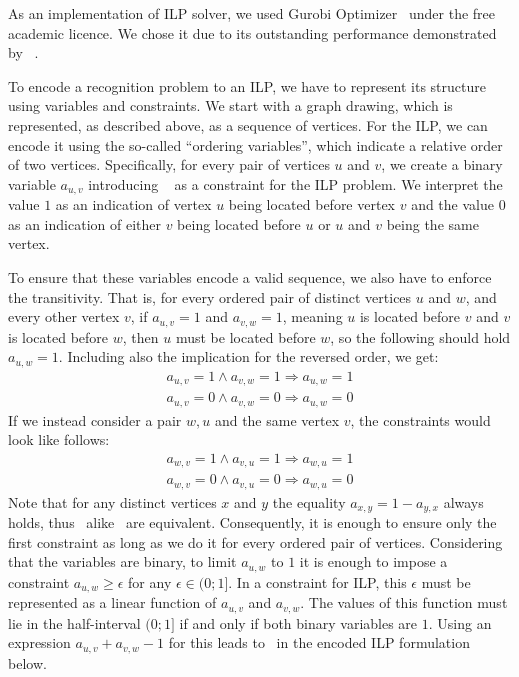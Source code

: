 As an implementation of ILP solver, we used Gurobi Optimizer~\cite{gurobi} under the free academic licence. We chose it due to its outstanding performance demonstrated by \citeauthor{Gurobi-performance}~\cite{Gurobi-performance}.

To encode a recognition problem to an ILP, we have to represent its structure using variables and constraints. We start with a graph drawing, which is represented, as described above, as a sequence of vertices. For the ILP, we can encode it using the so-called ``ordering variables'', which indicate a relative order of two vertices. Specifically, for every pair of vertices \(u\) and \(v\), we create a binary variable \(a_{u, v}\) introducing ~ as a constraint for the ILP problem. We interpret the value \(1\) as an indication of vertex \(u\) being located before vertex \(v\) and the value \(0\) as an indication of either \(v\) being located before \(u\) or \(u\) and \(v\) being the same vertex.

To ensure that these variables encode a valid sequence, we also have to enforce the transitivity. That is, for every ordered pair of distinct vertices \(u\) and \(w\), and every other vertex \(v\), if \(a_{u, v} = 1\) and \(a_{v, w} = 1\), meaning \(u\) is located before \(v\) and \(v\) is located before \(w\), then \(u\) must be located before \(w\), so the following should hold \(a_{u, w} = 1\). Including also the implication for the reversed order, we get:
\begin{align}
    a_{u, v} = 1 \land a_{v, w} = 1 \Longrightarrow a_{u, w} = 1 \label{eq:ilp:transitivity:uv:1}\\
    a_{u, v} = 0 \land a_{v, w} = 0 \Longrightarrow a_{u, w} = 0 \label{eq:ilp:transitivity:uv:0}
\end{align}
If we instead consider a pair \(w, u\) and the same vertex \(v\),  the constraints would look like follows:
\begin{align}
    a_{w, v} = 1 \land a_{v, u} = 1 \Longrightarrow a_{w, u} = 1 \label{eq:ilp:transitivity:vu:1} \\
    a_{w, v} = 0 \land a_{v, u} = 0 \Longrightarrow a_{w, u} = 0 \label{eq:ilp:transitivity:vu:0}
\end{align}
Note that for any distinct vertices \(x\) and \(y\) the equality \(a_{x, y} = 1 - a_{y, x}\) always holds, thus~ alike~ are equivalent. Consequently, it is enough to ensure only the first constraint as long as we do it for every ordered pair of vertices. Considering that the variables are binary, to limit \(a_{u, w}\) to \(1\) it is enough to impose a constraint \(a_{u, w} \geqslant \epsilon\) for any \(\epsilon \in (0;1]\). In a constraint for ILP, this \(\epsilon\) must be represented as a linear function of \(a_{u, v}\) and \(a_{v, w}\). The values of this function must lie in the half-interval \((0;1]\) if and only if both binary variables are \(1\). Using an expression \(a_{u, v} + a_{v, w} - 1\) for this leads to~ in the encoded ILP formulation below.

